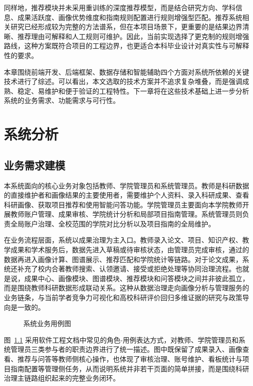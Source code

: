 \documentclass[12pt,a4paper]{ctexbook}
\begin{document}
同样地，推荐模块并未采用重训练的深度推荐模型，而是结合研究方向、学科信息、成果活跃度、画像优势维度和指南规则配置进行规则增强型匹配。推荐系统相关研究已经形成较为完整的方法谱系\cite{recsys_survey_cn_2022}\cite{next_gen_recsys_2007}，但在本项目场景下，更重要的是结果边界清晰、推荐理由可解释和人工规则可维护。因此，当前实现选择了更克制的规则增强路线，这种方案既符合项目的工程边界，也更适合本科毕业设计对真实性与可解释性的要求。

本章围绕前端开发、后端框架、数据存储和智能辅助四个方面对系统所依赖的关键技术进行了综述。可以看出，本文选取的技术方案并不追求复杂堆叠，而是强调成熟、稳定、易维护和便于验证的工程特性。下一章将在这些技术基础上进一步分析系统的业务需求、功能需求与可行性。

\chapter{系统分析}
\section{业务需求建模}
本系统面向的核心业务对象包括教师、学院管理员和系统管理员。教师是科研数据的直接维护者和画像结果的主要使用者，需要维护个人资料、录入科研成果、查看科研画像、获取项目推荐和使用智能问答功能。学院管理员主要面向本学院教师开展教师账户管理、成果审核、学院统计分析和局部项目指南管理。系统管理员则负责全局账户治理、全校范围的学院对比分析以及项目指南的全局维护。

在业务流程层面，系统以成果治理为主入口。教师录入论文、项目、知识产权、教学成果和学术服务后，数据先进入草稿或待审核状态，由管理员完成审核，通过的数据再进入画像计算、图谱展示、推荐匹配和学院统计等链路。对于论文成果，系统还补充了校内合著教师搜索、认领邀请、接受或拒绝处理等协同治理流程。也就是说，成果中心、画像模块、图谱模块、推荐模块和问答模块之间并非彼此孤立，而是围绕教师科研数据形成联动关系。这种从数据治理走向画像分析与管理服务的业务链条，与当前学者竞争力可视化和高校科研评价回归多维证据的研究与政策导向是一致的\cite{scholar_visualization_2020}\cite{sci_policy_2020}。

\begin{figure}[H]
  \centering
  
  \caption{系统业务用例图}
  \label{fig:usecase-overview}
\end{figure}

图~\ref{fig:usecase-overview} 采用软件工程文档中常见的角色-用例表达方式，对教师、学院管理员和系统管理员三类参与者的职责边界进行了统一描述。图中既保留了成果录入、画像查看、推荐与问答等教师侧核心操作，也体现了审核治理、账号维护、看板统计与项目指南配置等管理侧任务，从而说明系统并非若干页面的简单拼接，而是围绕科研治理主链路组织起来的完整业务闭环。
\end{document}
